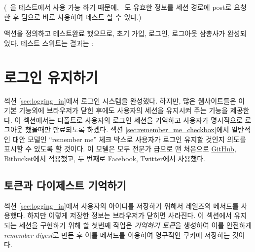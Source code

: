 \noindent (\ 을 테스트에서 사용 가능 하기 때문에, \ 도 유효한 정보를 세션 경로에 post로 요청한 후 덤으로 바로 사용하여 테스트 할 수 있다.) 

 액션을 정의하고 테스트완료 했으므로, 초기 가입, 로그인, 로그아웃 삼총사가 완성되었다. 테스트 스위트는 결과는 : 

\begin{codelisting}  

 \end{codelisting} 

\section{로그인 유지하기} \label{sec:remember_me} 

섹션 \ref{sec:logging_in}에서 로그인 시스템을 완성했다. 하지만, 많은 웹사이트들은 이 기본 기능외에 브라우저가 닫힌 후에도 사용자의 세션을 유지시켜 주는 기능을 제공한다. 이 섹션에서는 디폴트로 사용자의 로그인 세션을 기억하고 사용자가 명시적으로 로그아웃 했을때만 만료되도록 하겠다. 섹션 \ref{sec:remember_me_checkbox}에서 일반적인 대안 모델인  ``remember me'' 체크 박스로 사용자가 로그인 유지할 것인지 의도를 표시할 수 있도록 할 것이다. 이 모델은 모두 전문가 급으로 맨 처음으로 \href{http://github.com/}{GitHub}, \href{http://bitbucket.org/}{Bitbucket}에서 적용했고, 두 번째로 \href{http://www.facebook.com/}{Facebook}, \href{http://twitter.com/}{Twitter}에서 사용했다. 

\subsection{토큰과 다이제스트 기억하기} \label{sec:remember_token} 

섹션 \ref{sec:logging_in}에서 사용자의 아이디를 저장하기 위해서 레일즈의  메서드를 사용했다. 하지만 이렇게 저장한 정보는 브라우저가 닫히면 사라진다. 이 섹션에서 유지되는 세션을 구현하기 위해 할 첫번째 작업은 \emph{기억하기 토큰}을 생성하여 이를 안전하게 \emph{remember digest}로 만든 후 이를  메서드를 이용하여 영구적인 쿠키에 저장하는 것이다. 

